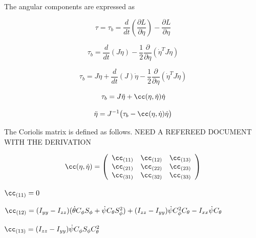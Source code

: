 \noindent The angular components are expressed as

\begin{equation}
    \tau = \tau_b =\frac{d}{dt} \left( \frac{\partial  L} {\partial \dot{\eta}}\right) - \frac{\partial  L}{\partial \eta}
\end{equation}

\begin{equation}
    \tau_b =\frac{d}{dt} ( J \dot{\eta} ) - \frac{1}{2} \frac{\partial}{\partial \eta} ( \dot{\eta}^T J \dot{\eta}  ) 
\end{equation}

\begin{equation}
    \tau_b =J \ddot{\eta} + \frac{d}{dt}(J) \dot{\eta} - \frac{1}{2} \frac{\partial}{\partial \eta} ( \dot{\eta}^T J \dot{\eta}  ) 
\end{equation}

\begin{equation}
    \tau_b =  J \ddot{\eta} + \cc(\eta,\dot{\eta}) \dot{\eta} 
\end{equation}

\begin{equation}
    \label{eq:angularacc}
    \ddot{\eta} = J^{-1} \big( \tau_b - \cc(\eta,\dot{\eta}) \dot{\eta} \big) 
\end{equation}


The Coriolis matrix is defined as follows. {\color{red} NEED A REFEREED DOCUMENT WITH THE DERIVATION}



\begin{equation}
    \cc(\eta,\dot{\eta}) = 
    \left(
        \begin{array}{c c c}
            \cc_{(11)} & \cc_{(12)} & \cc_{(13)} \\
            \cc_{(21)} & \cc_{(22)} & \cc_{(23)} \\
            \cc_{(31)} & \cc_{(32)} & \cc_{(33)} \\
        \end{array}
    \right)
\end{equation}




$\cc_{(11)} = 0$

$\cc_{(12)}  = (I_{yy}-I_{zz})  ( \dot{\theta} C_{\phi} S_{\phi} +  \dot{\psi} C_{\theta} S_{\phi}^2 )  + (I_{zz}-I_{yy})  \dot{\psi} C_{\phi}^2 C_{\theta} - I_{xx}  \dot{\psi} C_{\theta}$


$\cc_{(13)} = (I_{zz}-I_{yy})    \dot{\psi}   C_{\phi}   S_{\phi}  C_{\theta}^2$


